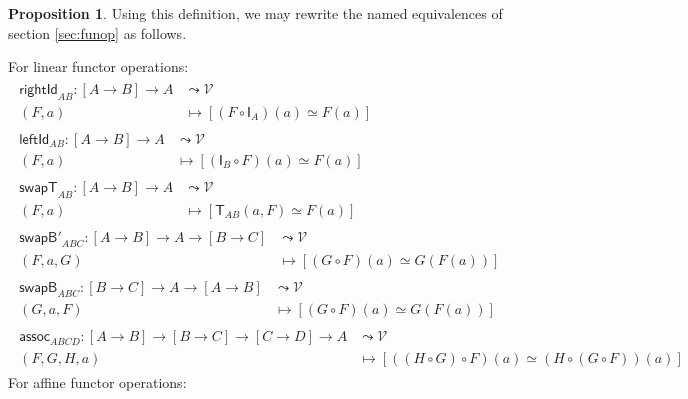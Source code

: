\documentclass[a4paper]{article}
\theoremstyle{definition}
\newtheorem{proposition}[definition]{Proposition}
\theoremstyle{remark}
\renewcommand{\equiv}{\simeq}
\newcommand{\V}{\mathcal{V}}
\newcommand{\nm}{\mathsf}
\newcommand{\combinator}{\nm}
\newcommand{\idFun}{\combinator{I}}
\newcommand{\revAppFun}{\combinator{T}}
\begin{document}
\begin{proposition}
  \label{prp:extensionality-axioms}
  Using this definition, we may rewrite the named equivalences of section
  \ref{sec:funop} as follows.

  For linear functor operations:
  \begin{gather*}
    \begin{aligned}
      \nm{rightId}_{AB} : [A \to B] \to A &\leadsto \V\\
                          (F,a)           &\mapsto  [(F \circ \idFun_A)(a) \equiv F(a)]
    \end{aligned}\\[1ex]
    \begin{aligned}
      \nm{leftId}_{AB} : [A \to B] \to A &\leadsto \V\\
                         (F,a)           &\mapsto  [(\idFun_B \circ F)(a) \equiv F(a)]
    \end{aligned}\\[1ex]
    \begin{aligned}
      \nm{swapT}_{AB} : [A \to B] \to A &\leadsto \V\\
                        (F,a)           &\mapsto  [\revAppFun_{AB}(a,F) \equiv F(a)]
    \end{aligned}\\[1ex]
    \begin{aligned}
      \nm{swapB'}_{ABC} : [A \to B] \to A \to [B \to C] &\leadsto \V\\
                          (F,a,G)                       &\mapsto  [(G \circ F)(a) \equiv G(F(a))]
    \end{aligned}\\[1ex]
    \begin{aligned}
      \nm{swapB}_{ABC} : [B \to C] \to A \to [A \to B] &\leadsto \V\\
                         (G,a,F)                       &\mapsto  [(G \circ F)(a) \equiv G(F(a))]
    \end{aligned}\\[1ex]
    \begin{aligned}
      \nm{assoc}_{ABCD} : [A \to B] \to [B \to C] \to [C \to D] \to A &\leadsto \V\\
                          (F,G,H,a)                                   &\mapsto  [((H \circ G) \circ F)(a) \equiv (H \circ (G \circ F))(a)]
    \end{aligned}
  \end{gather*}
  For affine functor operations:
  \begin{gather*}

\end{gather*}
\end{proposition}
\end{document}
